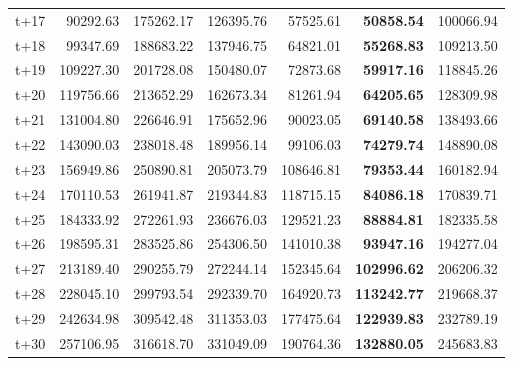 \begin{table}[H]
\begin{tabular}{lrrrrrr}
t+17  & 90292.63  & 175262.17  & 126395.76  & 57525.61  & \textbf{50858.54}  & 100066.94  \\
t+18  & 99347.69  & 188683.22  & 137946.75  & 64821.01  & \textbf{55268.83}  & 109213.50  \\
t+19  & 109227.30  & 201728.08  & 150480.07  & 72873.68  & \textbf{59917.16}  & 118845.26  \\
t+20  & 119756.66  & 213652.29  & 162673.34  & 81261.94  & \textbf{64205.65}  & 128309.98  \\
t+21  & 131004.80  & 226646.91  & 175652.96  & 90023.05  & \textbf{69140.58}  & 138493.66  \\
t+22  & 143090.03  & 238018.48  & 189956.14  & 99106.03  & \textbf{74279.74}  & 148890.08  \\
t+23  & 156949.86  & 250890.81  & 205073.79  & 108646.81  & \textbf{79353.44}  & 160182.94  \\
t+24  & 170110.53  & 261941.87  & 219344.83  & 118715.15  & \textbf{84086.18}  & 170839.71  \\
t+25  & 184333.92  & 272261.93  & 236676.03  & 129521.23  & \textbf{88884.81}  & 182335.58  \\
t+26  & 198595.31  & 283525.86  & 254306.50  & 141010.38  & \textbf{93947.16}  & 194277.04  \\
t+27  & 213189.40  & 290255.79  & 272244.14  & 152345.64  & \textbf{102996.62}  & 206206.32  \\
t+28  & 228045.10  & 299793.54  & 292339.70  & 164920.73  & \textbf{113242.77}  & 219668.37  \\
t+29  & 242634.98  & 309542.48  & 311353.03  & 177475.64  & \textbf{122939.83}  & 232789.19  \\
t+30  & 257106.95  & 316618.70  & 331049.09  & 190764.36  & \textbf{132880.05}  & 245683.83  \\

\bottomrule
\end{tabular}
\end{table}
